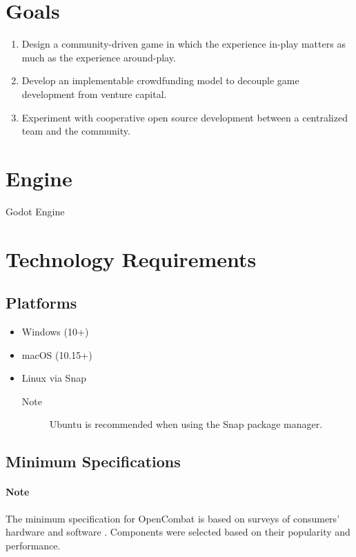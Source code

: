 \section{Goals}

\begin{enumerate}
    \item Design a community-driven game in which the experience in-play matters as much as the experience around-play.
    \item Develop an implementable crowdfunding model to decouple game development from venture capital.
    \item Experiment with cooperative open source development between a centralized team and the community.
\end{enumerate}

\section{Engine}

Godot Engine

\section{Technology Requirements}

\subsection{Platforms}

\begin{itemize}
    \item Windows (10+)
    \item macOS (10.15+)
    \item Linux via Snap
    \begin{description}
        \item[Note] Ubuntu is recommended when using the Snap package manager.
    \end{description}
\end{itemize}

\subsection{Minimum Specifications}

\paragraph{Note} The minimum specification for OpenCombat is based on surveys of consumers' hardware and software \autocite{valve_corporation_steam_nodate}. Components were selected based on their popularity and performance.

